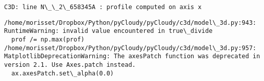 \documentclass[11pt]{article}
\begin{document}
    \begin{Verbatim}[commandchars=\\\{\}]
     C3D: line N\_\_2\_658345A : profile computed on axis x

    \end{Verbatim}

    \begin{Verbatim}[commandchars=\\\{\}]
/home/morisset/Dropbox/Python/pyCloudy/pyCloudy/c3d/model\_3d.py:943: RuntimeWarning: invalid value encountered in true\_divide
  prof /= np.max(prof)
/home/morisset/Dropbox/Python/pyCloudy/pyCloudy/c3d/model\_3d.py:957: MatplotlibDeprecationWarning: The axesPatch function was deprecated in version 2.1. Use Axes.patch instead.
  ax.axesPatch.set\_alpha(0.0)

    \end{Verbatim}

    \begin{center}
    \end{center}
    { \hspace*{\fill} \\}
    

    
    
    
    
\end{document}
